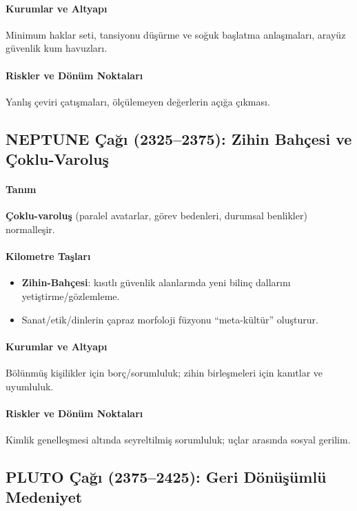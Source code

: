 \documentclass[11pt]{article}
\begin{document}
\begin{itemize}[noitemsep]
\begin{itemize}[noitemsep]
\begin{itemize}[noitemsep]
\begin{itemize}[noitemsep]
\begin{itemize}[noitemsep]
\begin{itemize}[noitemsep]
\begin{itemize}[noitemsep]
\begin{enumerate}[noitemsep]
\begin{itemize}[noitemsep]
\paragraph{Kurumlar ve Altyapı} Minimum haklar seti, tansiyonu düşürme ve soğuk başlatma anlaşmaları, arayüz güvenlik kum havuzları.

\paragraph{Riskler ve Dönüm Noktaları} Yanlış çeviri çatışmaları, ölçülemeyen değerlerin açığa çıkması.

\subsection{NEPTUNE Çağı (2325–2375): Zihin Bahçesi ve Çoklu-Varoluş}
\paragraph{Tanım} \textbf{Çoklu-varoluş} (paralel avatarlar, görev bedenleri, durumsal benlikler) normalleşir.

\paragraph{Kilometre Taşları}
\begin{itemize}[noitemsep]
  \item \textbf{Zihin-Bahçesi}: kısıtlı güvenlik alanlarında yeni bilinç dallarını yetiştirme/gözlemleme.
  \item Sanat/etik/dinlerin çapraz morfoloji füzyonu ``meta-kültür'' oluşturur.
\end{itemize}

\paragraph{Kurumlar ve Altyapı} Bölünmüş kişilikler için borç/sorumluluk; zihin birleşmeleri için kanıtlar ve uyumluluk.

\paragraph{Riskler ve Dönüm Noktaları} Kimlik genelleşmesi altında seyreltilmiş sorumluluk; uçlar arasında sosyal gerilim.

\subsection{PLUTO Çağı (2375–2425): Geri Dönüşümlü Medeniyet}

\end{itemize}
\end{enumerate}
\end{itemize}
\end{itemize}
\end{itemize}
\end{itemize}
\end{itemize}
\end{itemize}
\end{itemize}
\end{document}
